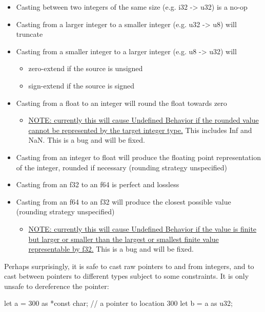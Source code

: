 \begin{itemize}
  \item{Casting between two integers of the same size (e.g. i32 -> u32) is a no-op}
  \item{Casting from a larger integer to a smaller integer (e.g. u32 -> u8) will truncate}
  \item{Casting from a smaller integer to a larger integer (e.g. u8 -> u32) will}
  \begin{itemize}
    \item{zero-extend if the source is unsigned}
    \item{sign-extend if the source is signed}
  \end{itemize}
  \item{Casting from a float to an integer will round the float towards zero}
  \begin{itemize}
    \item{\href{https://github.com/rust-lang/rust/issues/10184}{NOTE: currently this will cause Undefined Behavior if the rounded 
        value cannot be represented by the target integer type.} This includes Inf and NaN. This is a bug and will be fixed.}
  \end{itemize}
  \item{Casting from an integer to float will produce the floating point representation of the integer, rounded if necessary 
      (rounding strategy unspecified)}
  \item{Casting from an f32 to an f64 is perfect and lossless}
  \item{Casting from an f64 to an f32 will produce the closest possible value (rounding strategy unspecified)}
  \begin{itemize}
    \item{\href{https://github.com/rust-lang/rust/issues/15536}{NOTE: currently this will cause Undefined Behavior if the value 
        is finite but larger or smaller than the largest or smallest finite value representable by f32.} This is a bug and will be fixed.}
  \end{itemize}
\end{itemize}


Perhaps surprisingly, it is safe to cast raw pointers to and from integers, and to cast between pointers to different types subject 
to some constraints. It is only unsafe to dereference the pointer:

\begin{rustc}
let a = 300 as *const char; // a pointer to location 300
let b = a as u32;
\end{rustc}

